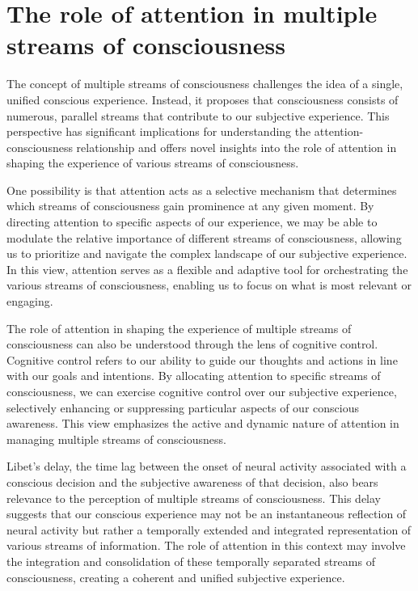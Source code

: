 \documentclass[10pt]{article}
\begin{document}
\begin{sloppypar}
  \section{The role of attention in multiple streams of consciousness}
  \label{sec:streams}

  The concept of multiple streams of consciousness challenges the idea of a single, unified conscious experience. Instead, it proposes that consciousness consists of numerous, parallel streams that contribute to our subjective experience. This perspective has significant implications for understanding the attention-consciousness relationship and offers novel insights into the role of attention in shaping the experience of various streams of consciousness.

  One possibility is that attention acts as a selective mechanism that determines which streams of consciousness gain prominence at any given moment. By directing attention to specific aspects of our experience, we may be able to modulate the relative importance of different streams of consciousness, allowing us to prioritize and navigate the complex landscape of our subjective experience. In this view, attention serves as a flexible and adaptive tool for orchestrating the various streams of consciousness, enabling us to focus on what is most relevant or engaging.

  The role of attention in shaping the experience of multiple streams of consciousness can also be understood through the lens of cognitive control. Cognitive control refers to our ability to guide our thoughts and actions in line with our goals and intentions. By allocating attention to specific streams of consciousness, we can exercise cognitive control over our subjective experience, selectively enhancing or suppressing particular aspects of our conscious awareness. This view emphasizes the active and dynamic nature of attention in managing multiple streams of consciousness.

  Libet’s delay, the time lag between the onset of neural activity associated with a conscious decision and the subjective awareness of that decision, also bears relevance to the perception of multiple streams of consciousness. This delay suggests that our conscious experience may not be an instantaneous reflection of neural activity but rather a temporally extended and integrated representation of various streams of information. The role of attention in this context may involve the integration and consolidation of these temporally separated streams of consciousness, creating a coherent and unified subjective experience.


\end{sloppypar}
\end{document}
